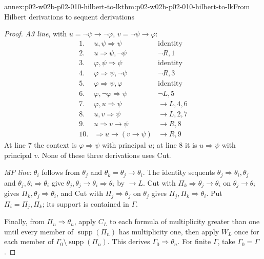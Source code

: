 \begin{annexitem}{annex:p02-w02b-p02-010-hilbert-to-lk}{thm:p02-w02b-p02-010-hilbert-to-lk}{From Hilbert derivations to sequent derivations}
\begin{proof}
\emph{A3 line}, with \(u=\neg\psi\to\neg\varphi\), \(v=\neg\psi\to\varphi\):
\[
\begin{array}{rll}
1.&u,\psi\Rightarrow\psi&\text{identity}\\
2.&u\Rightarrow\psi,\neg\psi&\neg R,1\\
3.&\varphi,\psi\Rightarrow\psi&\text{identity}\\
4.&\varphi\Rightarrow\psi,\neg\psi&\neg R,3\\
5.&\varphi\Rightarrow\psi,\varphi&\text{identity}\\
6.&\varphi,\neg\varphi\Rightarrow\psi&\neg L,5\\
7.&\varphi,u\Rightarrow\psi&\to L,4,6\\
8.&u,v\Rightarrow\psi&\to L,2,7\\
9.&u\Rightarrow v\to\psi&\to R,8\\
10.&\Rightarrow u\to(v\to\psi)&\to R,9
\end{array}
\]
At line 7 the context is \(\varphi\Rightarrow\psi\) with principal \(u\); at
line 8 it is \(u\Rightarrow\psi\) with principal \(v\).  None of these three
derivations uses Cut.

\emph{MP line}: \(\theta_i\) follows from \(\theta_j\) and
\(\theta_k=\theta_j\to\theta_i\).  The identity sequents
\(\theta_j\Rightarrow\theta_i,\theta_j\) and
\(\theta_j,\theta_i\Rightarrow\theta_i\) give
\(\theta_j,\theta_j\to\theta_i\Rightarrow\theta_i\) by \(\to L\).  Cut with
\(\Pi_k\Rightarrow\theta_j\to\theta_i\) on \(\theta_j\to\theta_i\) gives
\(\Pi_k,\theta_j\Rightarrow\theta_i\), and Cut with \(\Pi_j\Rightarrow\theta_j\)
on \(\theta_j\) gives \(\Pi_j,\Pi_k\Rightarrow\theta_i\).  Put
\(\Pi_i=\Pi_j,\Pi_k\); its support is contained in \(\Gamma\).

Finally, from \(\Pi_n\Rightarrow\theta_n\), apply \(C_L\) to each formula
of multiplicity greater than one until every member of
\(\operatorname{supp}(\Pi_n)\) has multiplicity one, then apply \(W_L\) once
for each member of \(\Gamma_0\setminus\operatorname{supp}(\Pi_n)\).  This
derives \(\Gamma_0\Rightarrow\theta_n\).  For finite \(\Gamma\), take
\(\Gamma_0=\Gamma\).
\end{proof}
\end{annexitem}

